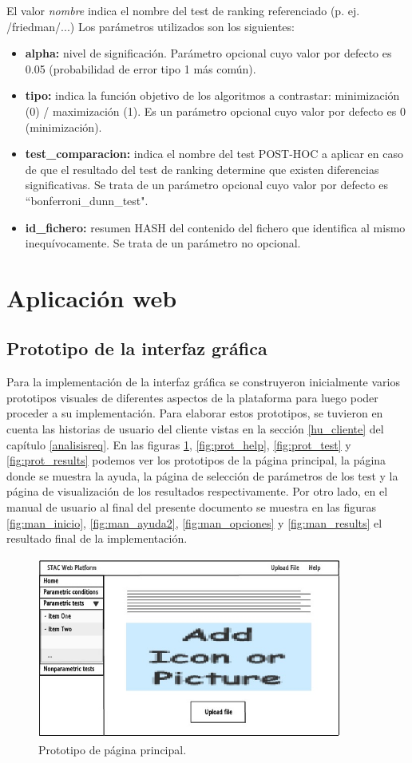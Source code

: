 El valor \textit{nombre} indica el nombre del test de ranking referenciado (p. ej. /friedman/...) Los parámetros utilizados son los siguientes:
\begin{itemize}
\item \textbf{alpha:} nivel de significación. Parámetro opcional cuyo valor por defecto es 0.05 (probabilidad de error tipo 1 más común).
\item \textbf{tipo:} indica la función objetivo de los algoritmos a contrastar: minimización (0) / maximización (1). Es un parámetro opcional cuyo valor por defecto es 0 (minimización).
\item \textbf{test\_comparacion:} indica el nombre del test POST-HOC a aplicar en caso de que el resultado del test de ranking determine que existen diferencias significativas. Se trata de un parámetro opcional cuyo valor por defecto es ``bonferroni\_dunn\_test".
\item \textbf{id\_fichero:} resumen HASH del contenido del fichero que identifica al mismo inequívocamente. Se trata de un parámetro no opcional.
\end{itemize}

\section{Aplicación web}
\subsection{Prototipo de la interfaz gráfica}
Para la implementación de la interfaz gráfica se construyeron inicialmente varios prototipos visuales de diferentes aspectos de la plataforma para luego poder proceder a su implementación. Para elaborar estos prototipos, se tuvieron en cuenta las historias de usuario del cliente vistas en la sección \ref{hu_cliente} del capítulo \ref{analisisreq}. En las figuras \ref{fig:prot_home}, \ref{fig:prot_help}, \ref{fig:prot_test} y \ref{fig:prot_results} podemos ver los prototipos de la página principal, la página donde se muestra la ayuda, la página de selección de parámetros de los test y la página de visualización de los resultados respectivamente. Por otro lado, en el manual de usuario al final del presente documento se muestra en las figuras \ref{fig:man_inicio}, \ref{fig:man_ayuda2}, \ref{fig:man_opciones} y \ref{fig:man_results} el resultado final de la implementación.

\begin{figure}[H]
\centering
\includegraphics[width=10cm,height=6cm]{figuras/prototipo_home.jpg}
\caption{Prototipo de página principal.}
\label{fig:prot_home}
\end{figure}

